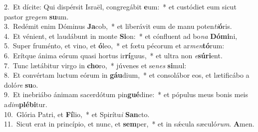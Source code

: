 {2.~}Et dícite: Qui dispérsit Israël, congregábit \textbf{e}um:~* et custódiet eum sicut pastor gre\textit{gem} \textbf{su}um.\\
{3.~}Redémit enim Dóminus \textbf{Ja}cob,~* et liberávit eum de manu poten\textit{ti}\textbf{ó}ris.\\
{4.~}Et vénient, et laudábunt in monte \textbf{Si}on:~* et cónfluent ad bo\textit{na} \textbf{Dó}\textbf{mi}ni,\\
{5.~}Super fruménto, et vino, et \textbf{ó}leo,~* et fœtu pécorum et ar\textit{men}\textbf{tó}rum:\\
{6.~}Erítque ánima eórum quasi hortus ir\textbf{rí}guus,~* et ultra non \textit{e}\textbf{sú}\textbf{ri}ent.\\
{7.~}Tunc lætábitur virgo in \textbf{cho}ro,~* júvenes et se\textit{nes} \textbf{si}mul:\\
{8.~}Et convértam luctum eórum in \textbf{gáu}dium,~* et consolábor eos, et lætificábo a doló\textit{re} \textbf{su}o.\\
{9.~}Et inebriábo ánimam sacerdótum pin\textbf{gué}dine:~* et pópulus meus bonis meis a\textit{dim}\textbf{plé}\textbf{bi}tur.\\
{10.~}Glória Patri, et \textbf{Fí}lio,~* et Spirítu\textit{i} \textbf{San}cto.\\
{11.~}Sicut erat in princípio, et nunc, et \textbf{sem}per,~* et in sǽcula sæculó\textit{rum}. \textbf{A}men.\\
